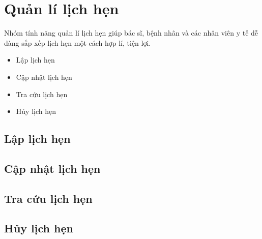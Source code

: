 \section{Quản lí lịch hẹn}

Nhóm tính năng quản lí lịch hẹn giúp bác sĩ, bệnh nhân và các nhân viên y tế dễ dàng sắp xếp lịch hẹn một cách hợp lí, tiện lợi.
\begin{itemize}
    \item Lập lịch hẹn
    \item Cập nhật lịch hẹn
    \item Tra cứu lịch hẹn
    \item Hủy lịch hẹn
\end{itemize}

\subsection{Lập lịch hẹn}

\subsection{Cập nhật lịch hẹn}

\subsection{Tra cứu lịch hẹn}

\subsection{Hủy lịch hẹn}